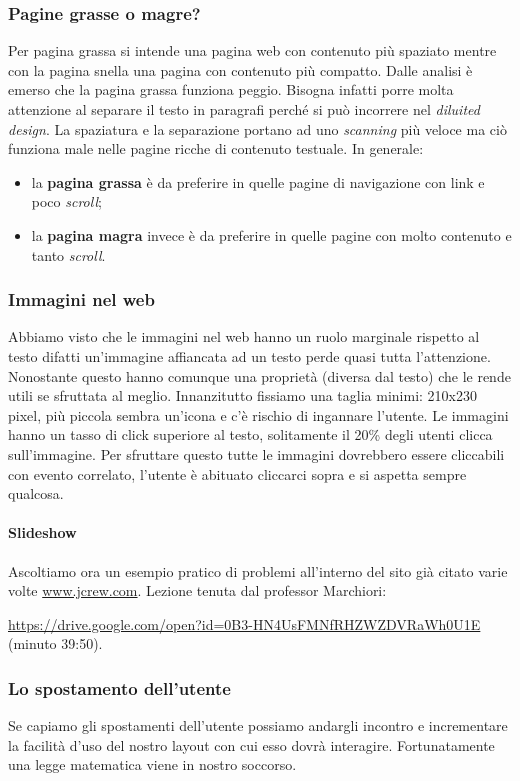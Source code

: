 		\subsubsection{Pagine grasse o magre?}
			Per pagina grassa si intende una pagina web con contenuto più spaziato mentre con la pagina snella una pagina con contenuto più compatto. Dalle analisi è emerso che la pagina grassa funziona peggio. Bisogna infatti porre molta attenzione al separare il testo in paragrafi perché si può incorrere nel \emph{diluited design}. La spaziatura e la separazione portano ad uno \emph{scanning} più veloce ma ciò funziona male nelle pagine ricche di contenuto testuale. In generale:
			\begin{itemize}
				\item la \textbf{pagina grassa} è da preferire in quelle pagine di navigazione con link e poco \emph{scroll};
				\item la \textbf{pagina magra} invece è da preferire in quelle pagine con molto contenuto e tanto \emph{scroll}.
			\end{itemize}
		
		\subsubsection{Immagini nel web}
			Abbiamo visto che le immagini nel web hanno un ruolo marginale rispetto al testo difatti un'immagine affiancata ad un testo perde quasi tutta l'attenzione. Nonostante questo hanno comunque una proprietà (diversa dal testo) che le rende utili se sfruttata al meglio. Innanzitutto fissiamo una taglia minimi: 210x230 pixel, più piccola sembra un'icona e c'è rischio di ingannare l'utente. Le immagini hanno un tasso di click superiore al testo, solitamente il 20\% degli utenti clicca sull'immagine. Per sfruttare questo tutte le immagini dovrebbero essere cliccabili con evento correlato, l'utente è abituato cliccarci sopra e si aspetta sempre qualcosa.
			
			\paragraph{Slideshow}
				Ascoltiamo ora un esempio pratico di problemi all'interno del sito già citato varie volte \href{http://www.jcrew.com}{www.jcrew.com}.
				Lezione tenuta dal professor Marchiori: 
								
				\url{https://drive.google.com/open?id=0B3-HN4UsFMNfRHZWZDVRaWh0U1E} (minuto 39:50).
			
		\subsubsection{Lo spostamento dell'utente}	
			Se capiamo gli spostamenti dell'utente possiamo andargli incontro e incrementare la facilità d'uso del nostro layout con cui esso dovrà interagire. Fortunatamente una legge matematica viene in nostro soccorso.
		
